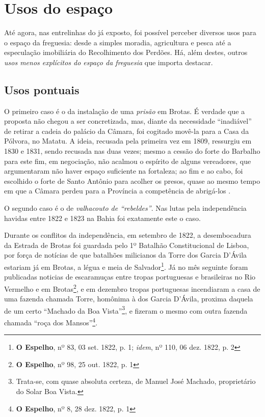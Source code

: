 \section{Usos do espaço}\label{sec:2.4}

Até agora, nas entrelinhas do já exposto, foi possível perceber diversos usos para o espaço da freguesia: desde a simples moradia, agricultura e pesca até a especulação imobiliária do Recolhimento dos Perdões. Há, além destes, outros \textit{usos menos explícitos do espaço da freguesia} que importa destacar.

\subsection{Usos pontuais}

O primeiro caso é o da instalação de uma \textit{prisão} em Brotas. É verdade que a proposta não chegou a ser concretizada, mas, diante da necessidade ``inadiável'' de retirar a cadeia do palácio da Câmara, foi cogitado movê-la para a Casa da Pólvora, no Matatu. A ideia, recusada pela primeira vez em 1809, ressurgiu em 1830 e 1831, sendo recusada nas duas vezes; mesmo a cessão do forte do Barbalho para este fim, em negociação, não acalmou o espírito de alguns vereadores, que argumentaram não haver espaço suficiente na fortaleza; ao fim e ao cabo, foi escolhido o forte de Santo Antônio para acolher os presos, quase ao mesmo tempo em que a Câmara perdeu para a Província a competência de abrigá-los \cite[pp.~304-305]{ruy_camara_1953}.

O segundo caso é o de \textit{valhacouto de ``rebeldes''}. Nas lutas pela independência havidas entre 1822 e 1823 na Bahia foi exatamente este o caso. 

Durante os conflitos da independência, em setembro de 1822, a desembocadura da Estrada de Brotas foi guardada pelo 1º Batalhão Constitucional de Lisboa, por força de notícias de que batalhões milicianos da Torre dos Garcia D'Ávila estariam já em Brotas, a légua e meia de Salvador\footnote{\textbf{O Espelho}, nº 83, 03 set. 1822, p. 1; \textit{idem}, nº 110, 06 dez. 1822, p. 2}. Já no mês seguinte foram publicadas noticias de escaramuças entre tropas portuguesas e brasileiras no Rio Vermelho e em Brotas\footnote{\textbf{O Espelho}, nº 98, 25 out. 1822, p. 1}, e em dezembro tropas portuguesas incendiaram a casa de uma fazenda chamada Torre, homônima à dos Garcia D'Ávila, proxima daquela de um certo ``Machado da Boa Vista''\footnote{Trata-se, com quase absoluta certeza, de Manuel José Machado, proprietário do Solar Boa Vista.}, e fizeram o mesmo com outra fazenda chamada ``roça dos Mansos''\footnote{\textbf{O Espelho}, nº 8, 28 dez. 1822, p. 1}.

